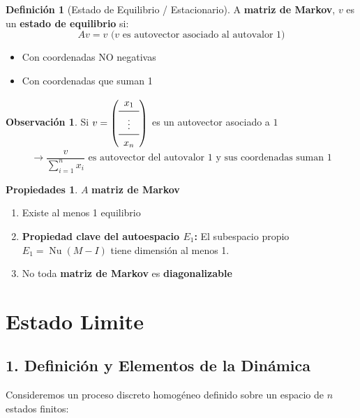\documentclass[11pt,a4paper]{article}
\theoremstyle{definition}
\newtheorem{definicion}{Definición}
\newtheorem{observacion}{Observación}
\newtheorem{propiedades}{Propiedades}
\begin{document}
\begin{definicion}[Estado de Equilibrio / Estacionario]
    A \textbf{matriz de Markov}, $v$ es un \textbf{estado de equilibrio} si:
    \[
        A v = v \text{  ($v$ es autovector asociado al autovalor 1)}
    \]
    \begin{itemize}
        \item Con coordenadas NO negativas
        \item Con coordenadas que suman 1
    \end{itemize}
\end{definicion}
\begin{observacion}
    Si $v = \left( 
                \begin{array}{c}
                    x_1 \\
                    \midrule
                    \vdots \\
                    \midrule
                    x_n
                \end{array}
            \right)$ es un autovector asociado a $1$ 
    \[
        \rightarrow \frac{v}{\sum_{i=1}^{n}x_i} \text{  es autovector del autovalor 1 y sus coordenadas suman 1}
    \]
\end{observacion}
\begin{propiedades} $A$ \textbf{matriz de Markov}
    \begin{enumerate}
        \item Existe al menos 1 equilibrio
        \item \textbf{Propiedad clave del autoespacio $E_1$:}
            El subespacio propio $E_1 = \operatorname{Nu}(M - I)$ tiene dimensión al menos 1.
        \item No toda \textbf{matriz de Markov} es \textbf{diagonalizable}
    \end{enumerate}
\end{propiedades}

\section{Estado Limite}
\subsection*{1. Definición y Elementos de la Dinámica}

Consideremos un proceso discreto homogéneo definido sobre un espacio de $n$ estados finitos:
\end{document}

